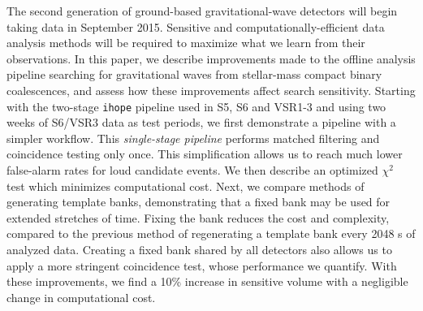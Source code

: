 The second generation of ground-based gravitational-wave
detectors will begin taking data in September 2015. Sensitive and
computationally-efficient data analysis methods will be required to maximize
what we learn from their observations. In this paper, we describe improvements
made to the offline analysis pipeline searching for gravitational waves from
stellar-mass compact binary coalescences, and assess how these improvements
affect search sensitivity. Starting with the two-stage \texttt{ihope} pipeline
used in S5, S6 and VSR1-3 and using two weeks of S6/VSR3 data as test periods,
we first demonstrate a pipeline with a simpler workflow. This
\emph{single-stage pipeline} performs matched filtering and coincidence
testing only once. This simplification allows us to reach much lower
false-alarm rates for loud candidate events. We then describe an optimized
$\chi^2$ test which minimizes computational cost. Next, we compare methods of
generating template banks, demonstrating that a fixed bank may be used for
extended stretches of time. Fixing the bank reduces the cost and complexity,
compared to the previous method of regenerating a template bank every 2048 s
of analyzed data. Creating a fixed bank shared by all detectors also allows us
to apply a more stringent coincidence test, whose performance we quantify.
With these improvements, we find a 10\% increase in sensitive volume
with a negligible change in computational cost.
